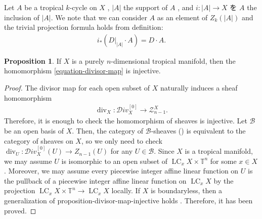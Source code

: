 \documentclass[a4paper,dvipdfmx,reqno,12pt]{amsart}
\theoremstyle{definition}
\newtheorem{proposition}[theorem]{Proposition}
\newcommand{\opn}[1]{\operatorname{#1}}
\numberwithin{equation}{section}
\begin{document}
Let $A$ be a tropical $k$-cycle on $X$
, $|A|$ the support of $A$
\cite[Definition 3.5]{MR4637248},
and $i\colon |A|\to X$ を $A$
the inclusion of $|A|$.
We note that we can consider $A$ as an
element of $Z_k(|A|)$ and 
the trivial projection
formula holds from definition:
\begin{align}
\label{equation-projection-formula}
i_*(D|_{|A|}\cdot A)=D\cdot A.
\end{align}

\begin{proposition}
\label{proposition-divisor-map-injective}
If $X$ is a purely $n$-dimensional
tropical manifold,
then the homomorphism \eqref{equation-divisor-map}
is injective.
\end{proposition}
\begin{proof}
The divisor map for each open subset of $X$
naturally induces
a sheaf homomorphism
\begin{align}
\opn{div}_X\colon \mathcal{D}iv_X^{[0]}\to 
\mathscr{Z}_{n-1}^{X}.
\end{align}
Therefore, it is enough to check the homomorphism
of sheaves is injective.
Let $\mathcal{B}$ be an open basis of $X$.
Then, the category of $\mathcal{B}$-sheaves
(\cite[p.49-50]{MR2675155})
is equivalent to the category of sheaves on
$X$, so we only need to check 
$\opn{div}_{U}\colon \mathcal{D}iv_X^{[0]}(U)\to Z_{n-1}(U)$
for any $U\in \mathcal{B}$.
Since $X$ is a tropical manifold, we may assume
$U$ is isomorphic to an open subset
of $\opn{LC}_x X\times \mathbb{T}^{n}$
for some $x\in X$.
Moreover, we may assume every piecewise
integer affine linear function on $U$ is the pullback
of a piecewise
integer affine linear function on $\opn{LC}_x X$ 
by the projection $\opn{LC}_x X\times \mathbb{T}^{n}\to \opn{LC}_x X$
locally. If $X$ is boundaryless, then
a generalization of {proposition-divisor-map-injective}
holds
\cite[Theorem 4.5]{MR4246795}.
Therefore, it has been proved.
\end{proof}
\end{document}
